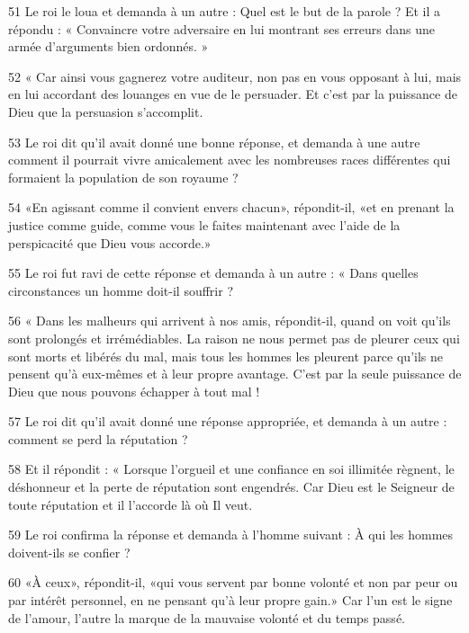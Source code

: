 \par 51 Le roi le loua et demanda à un autre : Quel est le but de la parole ? Et il a répondu : « Convaincre votre adversaire en lui montrant ses erreurs dans une armée d'arguments bien ordonnés. »

\par 52 « Car ainsi vous gagnerez votre auditeur, non pas en vous opposant à lui, mais en lui accordant des louanges en vue de le persuader. Et c'est par la puissance de Dieu que la persuasion s'accomplit.

\par 53 Le roi dit qu'il avait donné une bonne réponse, et demanda à une autre comment il pourrait vivre amicalement avec les nombreuses races différentes qui formaient la population de son royaume ?

\par 54 «En agissant comme il convient envers chacun», répondit-il, «et en prenant la justice comme guide, comme vous le faites maintenant avec l'aide de la perspicacité que Dieu vous accorde.»

\par 55 Le roi fut ravi de cette réponse et demanda à un autre : « Dans quelles circonstances un homme doit-il souffrir ?

\par 56 « Dans les malheurs qui arrivent à nos amis, répondit-il, quand on voit qu'ils sont prolongés et irrémédiables. La raison ne nous permet pas de pleurer ceux qui sont morts et libérés du mal, mais tous les hommes les pleurent parce qu'ils ne pensent qu'à eux-mêmes et à leur propre avantage. C'est par la seule puissance de Dieu que nous pouvons échapper à tout mal !

\par 57 Le roi dit qu'il avait donné une réponse appropriée, et demanda à un autre : comment se perd la réputation ?

\par 58 Et il répondit : « Lorsque l'orgueil et une confiance en soi illimitée règnent, le déshonneur et la perte de réputation sont engendrés. Car Dieu est le Seigneur de toute réputation et il l'accorde là où Il veut.

\par 59 Le roi confirma la réponse et demanda à l'homme suivant : À qui les hommes doivent-ils se confier ?

\par 60 «À ceux», répondit-il, «qui vous servent par bonne volonté et non par peur ou par intérêt personnel, en ne pensant qu'à leur propre gain.» Car l’un est le signe de l’amour, l’autre la marque de la mauvaise volonté et du temps passé.

